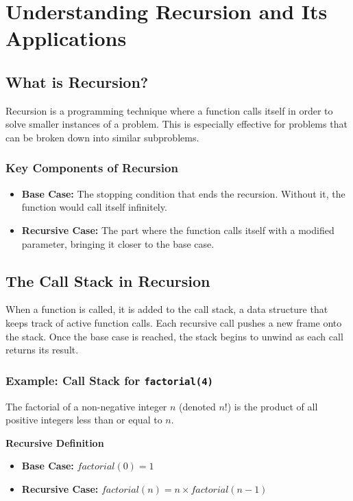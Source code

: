 \usetikzlibrary{trees, positioning, arrows.meta}
\section{Understanding Recursion and Its Applications}
\subsection{What is Recursion?}

Recursion is a programming technique where a function calls itself in order to solve smaller instances of a problem. This is especially effective for problems that can be broken down into similar subproblems.

\subsubsection*{Key Components of Recursion}
\begin{itemize}
    \item \textbf{Base Case:} The stopping condition that ends the recursion. Without it, the function would call itself infinitely.
    \item \textbf{Recursive Case:} The part where the function calls itself with a modified parameter, bringing it closer to the base case.
\end{itemize}

\subsection{The Call Stack in Recursion}

When a function is called, it is added to the call stack, a data structure that keeps track of active function calls. Each recursive call pushes a new frame onto the stack. Once the base case is reached, the stack begins to unwind as each call returns its result.

\subsubsection*{Example: Call Stack for \texttt{factorial(4)}}

The factorial of a non-negative integer $n$ (denoted $n!$) is the product of all positive integers less than or equal to $n$.

\textbf{Recursive Definition}

\begin{itemize}
    \item \textbf{Base Case:} $factorial(0) = 1$
    \item \textbf{Recursive Case:} $factorial(n) = n \times factorial(n - 1)$
\end{itemize}

